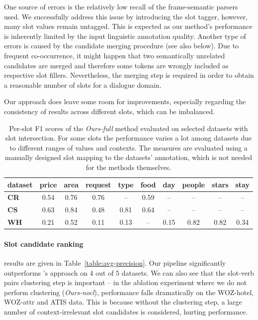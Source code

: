 One source of errors is the relatively low recall of the frame-semantic parsers used.
We successfully address this issue by introducing the slot tagger, however, many slot values remain untagged.
This is expected as our method's performance is inherently limited by the input linguistic annotation quality.
Another type of errors is caused by the candidate merging procedure (see also below).
Due to frequent co-occurrence, it might happen that two semantically unrelated candidates are merged and therefore some tokens are wrongly included as respective slot fillers.
Nevertheless, the merging step is required in order to obtain a reasonable number of slots for a dialogue domain.

Our approach does leave some room for improvements, especially regarding the consistency of results across different slots, which can be imbalanced.
\begin{table}[h]
    \centering
    \small
    \begin{tabular}{l|ccccccccc}
    \hline
    \textbf{dataset} & \textbf{price} & \textbf{area} & \textbf{request} & \textbf{type} & \textbf{food} & \textbf{day} & \textbf{people} & \textbf{stars} & \textbf{stay}
    \\ \hline
    \textbf{CR} & 0.54 & 0.76 & 0.76 & -- & 0.59 & -- & -- & -- & -- \\
    \textbf{CS} & 0.63 & 0.84 & 0.48 & 0.81 & 0.64 & -- & -- & -- & -- \\
    \textbf{WH} & 0.21 & 0.52 & 0.11 & 0.13 & -- & 0.15 & 0.82 & 0.82 & 0.34 \\
    \hline
    \end{tabular}
    
    \caption{Per-slot F1 scores of the \emph{Ours-full} method evaluated on selected datasets with slot intersection. For some slots the performance varies a lot among datasets due to different ranges of values and contexts. The measures are evaluated using a manually designed slot mapping to the datasets' annotation, which is not needed for the methods themselves.}
    \label{table:slotfilling_detail}
\end{table}

\paragraph{Slot candidate ranking}\hspace{-3mm} results are given in Table~\ref{table:avg-precision}.
Our pipeline significantly outperforms \citet{chen2014leveraging}'s approach on 4 out of 5 datasets.
We can also see that the slot-verb pairs clustering step is important -- in the ablation experiment where we do not perform clustering (\emph{Ours-nocl}),
performance falls dramatically on the WOZ-hotel, WOZ-attr and ATIS data.
This is because without the clustering step, a large number of context-irrelevant slot candidates is considered, hurting performance.

